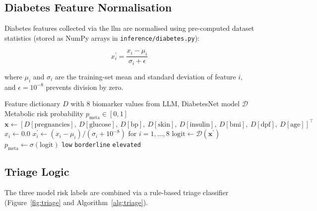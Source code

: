 \subsection{Diabetes Feature Normalisation}

Diabetes features collected via the \ac{llm} are normalised using pre-computed dataset statistics (stored as NumPy arrays in \texttt{inference/diabetes.py}):

\begin{equation}
	x^{\prime}_i = \frac{x_i - \mu_i}{\sigma_i + \epsilon}
\end{equation}

where $\mu_i$ and $\sigma_i$ are the training-set mean and standard deviation of feature $i$, and $\epsilon = 10^{-8}$ prevents division by zero.

\begin{algorithm}
\caption{DiabetesNet Inference Pipeline}\label{alg:diabetes}
\begin{algorithmic}
    \Require Feature dictionary $D$ with 8 biomarker values from LLM, DiabetesNet model $\mathcal{D}$
    \Ensure Metabolic risk probability $p_{\text{meta}} \in [0, 1]$
    \State $\mathbf{x} \gets [D[\text{pregnancies}],\ D[\text{glucose}],\ D[\text{bp}],\ D[\text{skin}],\ D[\text{insulin}],\ D[\text{bmi}],\ D[\text{dpf}],\ D[\text{age}]]^\top$
         \State $x_i \gets 0.0$ 
        \EndIf
    \EndFor
    \State $x^{\prime}_i \gets (x_i - \mu_i) / (\sigma_i + 10^{-8})$ for $i = 1, \ldots, 8$
    \State $\text{logit} \gets \mathcal{D}(\mathbf{x}^{\prime})$ 
    \State $p_{\text{meta}} \gets \sigma(\text{logit})$
     \Return \texttt{low}
     \Return \texttt{borderline}
    \Else{} \Return \texttt{elevated}
    \EndIf
\end{algorithmic}
\end{algorithm}

\subsection{Triage Logic}

The three model risk labels are combined via a rule-based triage classifier (Figure~\ref{fig:triage} and Algorithm~\ref{alg:triage}).

